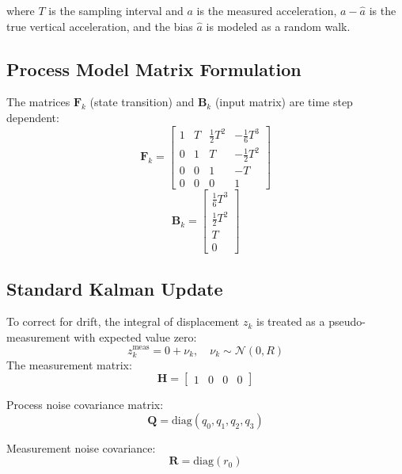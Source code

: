 \documentclass[11pt,letterpaper]{article}
\begin{document}
where $T$ is the sampling interval and $a$ is the measured acceleration, $a - \hat{a}$ is the true vertical acceleration, and the bias $\hat{a}$ is modeled as a random walk.

\subsection*{Process Model Matrix Formulation}
The matrices \( \mathbf{F}_k \) (state transition) and \( \mathbf{B}_k \) (input matrix) are time step dependent:
\begin{equation}
\mathbf{F}_k =
\begin{bmatrix}
1 & T & \frac{1}{2}T^2 & -\frac{1}{6}T^3 \\
0 & 1 & T & -\frac{1}{2}T^2 \\
0 & 0 & 1 & -T \\
0 & 0 & 0 & 1
\end{bmatrix}
\end{equation}
\begin{equation}
\mathbf{B}_k =
\begin{bmatrix}
\frac{1}{6}T^3 \\
\frac{1}{2}T^2 \\
T \\
0
\end{bmatrix}
\end{equation}

\subsection*{Standard Kalman Update}
To correct for drift, the integral of displacement \( z_k \) is treated as a pseudo-measurement with expected value zero:
\begin{equation}
z_k^\text{meas} = 0 + \nu_k, \quad \nu_k \sim \mathcal{N}(0, R)
\end{equation}
The measurement matrix:
\begin{equation}
\mathbf{H} = \begin{bmatrix} 1 & 0 & 0 & 0 \end{bmatrix}
\end{equation}

Process noise covariance matrix:
\begin{equation}
\bm{Q} = \mathrm{diag}(q_0, q_1, q_2, q_3)
\end{equation}

Measurement noise covariance:
\begin{equation}
\bm{R} = \mathrm{diag}(r_0)
\end{equation}
\end{document}
